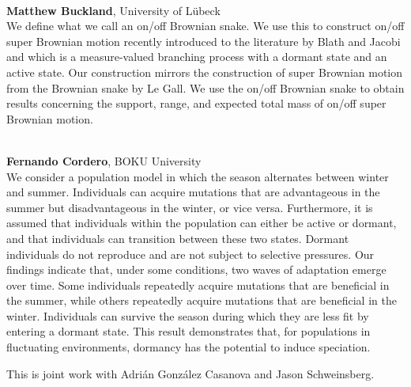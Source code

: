 \documentclass[12pt,a4paper]{article}
\begin{document}
\bigskip\bigskip

\\[1ex]{ \large \textbf{ Matthew Buckland}}, University of Lübeck \\[2ex] We define what we call an on/off Brownian snake. We use this to construct on/off super Brownian motion recently introduced to the literature by Blath and Jacobi and which is a measure-valued branching process with a dormant state and an active state. Our construction mirrors the construction of super Brownian motion from the Brownian snake by Le Gall. We use the on/off Brownian snake to obtain results concerning the support, range, and expected total mass of on/off super Brownian motion. 

\bigskip\bigskip

\\[1ex]{ \large \textbf{ Fernando Cordero}}, BOKU University \\[2ex] We consider a population model in which the season alternates between winter and summer. Individuals can acquire mutations that are advantageous in the summer but disadvantageous in the winter, or vice versa.  Furthermore, it is assumed that individuals within the population can either be active or dormant, and that individuals can transition between these two states.  Dormant individuals do not reproduce and are not subject to selective pressures. Our findings indicate that, under some conditions, two waves of adaptation emerge over time. Some individuals repeatedly acquire mutations that are beneficial in the summer, while others repeatedly acquire mutations that are beneficial in the winter. Individuals can survive the season during which they are less fit by entering a dormant state. This result demonstrates that, for populations in fluctuating environments, dormancy has the potential to induce speciation. 

 This is joint work with Adrián González Casanova and Jason Schweinsberg. 

\bigskip\bigskip

\newpage
\end{document}
